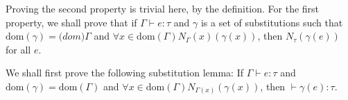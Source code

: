 Proving the second property is trivial here, by the definition.
For the first property, we shall prove that if $\Gamma \vdash e : \tau$ and $\gamma$ is a set of substitutions
such that $\mathrm{dom}(\gamma) = \mathrm(dom){\Gamma}$ and $\forall x\in \mathrm{dom}(\Gamma) N_\Gamma(x) (\gamma(x))$,
then $N_\tau(\gamma(e))$ for all $e$.

We shall first prove the following substitution lemma: If $\Gamma \vdash e : \tau$ and $\mathrm{dom}(\gamma) = \mathrm{dom}({\Gamma})$ 
and $\forall x\in \mathrm{dom}(\Gamma) N_{\Gamma(x)} (\gamma(x))$, then $\vdash \gamma(e) : \tau$.

